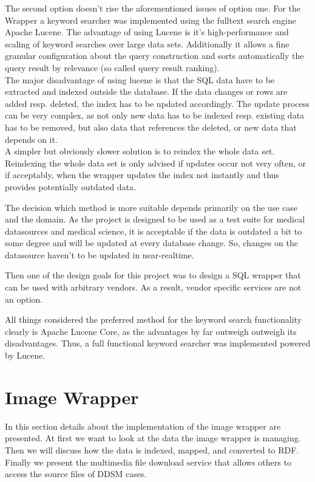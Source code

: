 The second option doesn't rise the aforementioned issues of option one. For the Wrapper a keyword searcher was implemented using the fulltext search engine Apache Lucene. The advantage of using Lucene is it's high-performance and scaling of keyword searches over large data sets. Additionally it allows a fine granular configuration about the query construction and sorts automatically the query result by relevance (so called query result ranking). \\
The major disadvantage of using lucene is that the SQL data have to be extracted and indexed outside the database. If the data changes or rows are added resp. deleted, the index has to be updated accordingly. The update process can be very complex, as not only new data has to be indexed resp. existing data has to be removed, but also data that references the deleted, or new data that depends on it.\\
A simpler but obviously slower solution is to reindex the whole data set. Reindexing the whole data set is only advised if updates occur not very often, or if acceptably, when the wrapper updates the index not instantly and thus provides potentially outdated data.

The decision which method is more suitable depends primarily on the use case and the domain. As the project is designed to be used as a test suite for medical datasources and medical science, it is acceptable if the data is outdated a bit to some degree and will be updated at every database change. So, changes on the datasource haven't to be updated in near-realtime.

Then one of the design goals for this project was to design a SQL wrapper that can be used with arbitrary vendors. As a result, vendor specific services are not an option.

All things considered the preferred method for the keyword search functionality clearly is Apache Lucene Core, as the advantages by far outweigh outweigh its disadvantages. Thus, a full functional keyword searcher was implemented powered by Lucene.


\section{Image Wrapper}
 
In this section details about the implementation of the image wrapper are presented. 
At first we want to look at the data the image wrapper is managing. Then we will discuss how the data is indexed, mapped, and converted to RDF. Finally we present the multimedia file download service that allows others to access the source files of DDSM cases.

